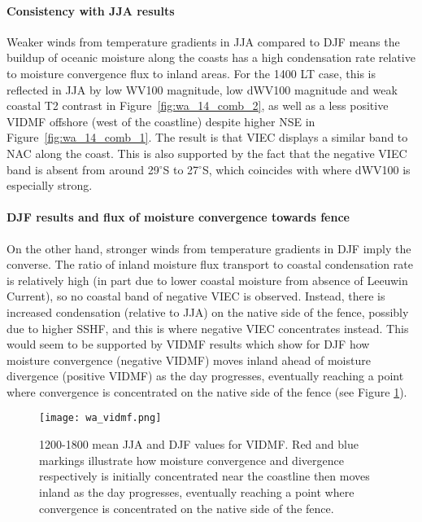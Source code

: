 \paragraph{Consistency with JJA results}

Weaker winds from temperature gradients in \ac{JJA} compared to \ac{DJF} means the buildup of oceanic moisture along the coasts has a high condensation rate relative to moisture convergence flux to inland areas. For the 1400 \ac{LT} case, this is reflected in \ac{JJA} by low \ac{WV100} magnitude, low \ac{dWV100} magnitude and weak coastal \ac{T2} contrast in Figure~\ref{fig:wa_14_comb_2}, as well as a less positive \ac{VIDMF} offshore (west of the coastline) despite higher \ac{NSE} in Figure~\ref{fig:wa_14_comb_1}. The result is that \ac{VIEC} displays a similar band to \ac{NAC} along the coast. This is also supported by the fact that the negative \ac{VIEC} band is absent from around 29$^\circ$S to 27$^\circ$S, which coincides with where \ac{dWV100} is especially strong.

\paragraph{DJF results and flux of moisture convergence towards fence}

On the other hand, stronger winds from temperature gradients in \ac{DJF} imply the converse. The ratio of inland moisture flux transport to coastal condensation rate is relatively high (in part due to lower coastal moisture from absence of Leeuwin Current), so no coastal band of negative \ac{VIEC} is observed. Instead, there is increased condensation (relative to \ac{JJA}) on the native side of the fence, possibly due to higher \ac{SSHF}, and this is where negative \ac{VIEC} concentrates instead. This would seem to be supported by \ac{VIDMF} results which show for \ac{DJF} how moisture convergence (negative \ac{VIDMF}) moves inland ahead of moisture divergence (positive \ac{VIDMF}) as the day progresses, eventually reaching a point where convergence is concentrated on the native side of the fence (see Figure \ref{fig:wa_vidmf}).

\begin{figure}[!htp]
	\centering
	\texttt{[image: wa\_vidmf.png]}
	\caption[1200-1800 means for VIDMF]{1200-1800 mean \acs{JJA} and \acs{DJF} values for \acs{VIDMF}. Red and blue markings illustrate how moisture convergence and divergence respectively is initially concentrated near the coastline then moves inland as the day progresses, eventually reaching a point where convergence is concentrated on the native side of the fence.}
	\label{fig:wa_vidmf}
\end{figure}

